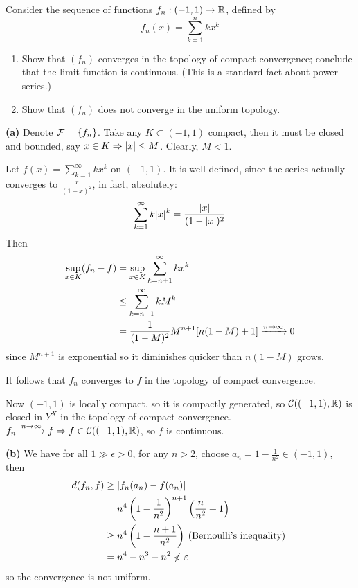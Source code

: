 \documentclass[a4paper, 10pt]{article}
\begin{document}
\begin{problem} [46.5 \done]
    Consider the sequence of functions $f_n: (-1, 1) \to \mathbb{R}$, defined by \begin{equation*}
    f_n(x) = \sum_{k=1}^{n} k x^k
    \end{equation*}
    \begin{enumerate}
    \item Show that $(f_n)$ converges in the topology of compact convergence; conclude that the limit function is continuous. (This is a standard fact about power series.)
    \item Show that $(f_n)$ does not converge in the uniform topology.
    \end{enumerate}
\end{problem}
\begin{solution}
\textbf{(a)} Denote $\mathcal{F} = \{f_n\}$. Take any $K \subset (-1, 1)$ compact, then it must be closed and bounded, say $x \in K \Rightarrow \lvert x\rvert \leq M$. Clearly, $M < 1$.

Let $f(x) = \sum_{k=1}^{\infty} kx^k$ on $(-1, 1)$. It is well-defined, since the series actually converges to $\frac{x}{(1- x)^2}$, in fact, absolutely:
\begin{equation*}
\sum_{k=1}^{\infty} k \lvert x\rvert^k = \frac{\lvert x\rvert}{(1 - \lvert x\rvert)^2}
\end{equation*}
Then
\begin{align*}
\sup_{x \in K} (f_n - f) &= \sup_{x \in K} \sum_{k=n+1}^{\infty} kx^k \\
&\leq \sum_{k=n+1}^{\infty} k M^k \\
&= \frac{1}{(1-M)^2} M^{n+1}[n(1-M) + 1] \xrightarrow{n \to \infty} 0
\end{align*}
since $M^{n+1}$ is exponential so it diminishes quicker than $n(1-M)$ grows.

It follows that $f_n$ converges to $f$ in the topology of compact convergence.

Now $(-1, 1)$ is locally compact, so it is compactly generated, so $\mathcal{C}((-1, 1), \mathbb{R})$ is closed in $Y^X$ in the topology of compact convergence. $f_n \xrightarrow{n \to \infty} f \Rightarrow f \in \mathcal{C}((-1, 1), \mathbb{R})$, so $f$ is continuous.

\textbf{(b)} We have for all $1 \gg \epsilon > 0$, for any $n > 2$, choose $a_n = 1 - \frac{1}{n^2} \in (-1, 1)$, then
\begin{align*}
d(f_n, f) &\geq \lvert f_n(a_n) - f(a_n)\rvert \\
&= n^4 \left(1 - \frac{1}{n^2}\right)^{n+1} \left(\frac{n}{n^2} + 1\right) \\
&\geq n^4 \left(1 - \frac{n+1}{n^2}\right) \:\text{(Bernoulli's inequality)}\: \\
&= n^4 - n^3 - n^2 \not < \varepsilon
\end{align*}
so the convergence is not uniform.
\end{solution}
\end{document}
